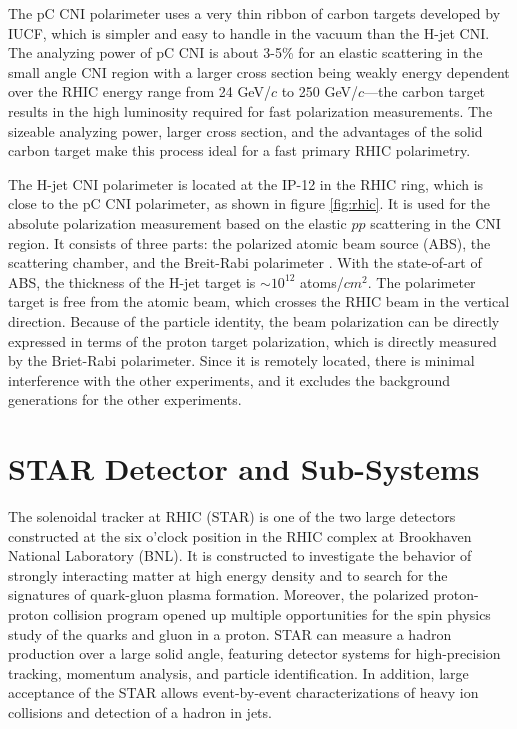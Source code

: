 The pC CNI polarimeter uses a very thin ribbon of carbon targets developed by IUCF, which is simpler and easy to handle in the vacuum than the H-jet CNI. The analyzing power of pC CNI is about 3-5\% for an elastic scattering in the small angle CNI region with a larger cross section being weakly energy dependent over the RHIC energy range from 24 GeV/$c$ to 250 GeV/$c$—the carbon target results in the high luminosity required for fast polarization measurements. The sizeable analyzing power, larger cross section, and the advantages of the solid carbon target make this process ideal for a fast primary RHIC polarimetry.   

The H-jet CNI polarimeter is located at the IP-12 in the RHIC ring, which is close to the pC CNI polarimeter, as shown in figure \ref{fig:rhic}. It is used for the absolute polarization measurement based on the elastic $pp$ scattering in the CNI region. It consists of three parts: the polarized atomic beam source (ABS), the scattering chamber, and the Breit-Rabi polarimeter \cite{Baumgarten2002}. With the state-of-art of ABS, the thickness of the H-jet target is $\sim 10^{12}$ atoms/$cm^2$. The  polarimeter target is free from the atomic beam, which crosses the RHIC beam in the vertical direction. Because of the particle identity, the beam polarization can be directly expressed in terms of the proton target polarization, which is directly measured by the Briet-Rabi polarimeter. Since it is remotely located, there is minimal interference with the other experiments, and it excludes the background generations for the other experiments.   

\section{STAR Detector and Sub-Systems}
The solenoidal tracker at RHIC (STAR) is one of the two large detectors constructed at the six o'clock position in the RHIC complex at Brookhaven National Laboratory (BNL). It is constructed to investigate the behavior of strongly interacting matter at high energy density and to search for the signatures of quark-gluon plasma formation. Moreover, the polarized proton-proton collision program opened up multiple opportunities for the spin physics study of the quarks and gluon in a proton. STAR can measure a hadron production over a large solid angle, featuring detector systems for high-precision tracking, momentum analysis, and particle identification. In addition, large acceptance of the STAR allows event-by-event characterizations of heavy ion collisions and detection of a hadron in jets.

